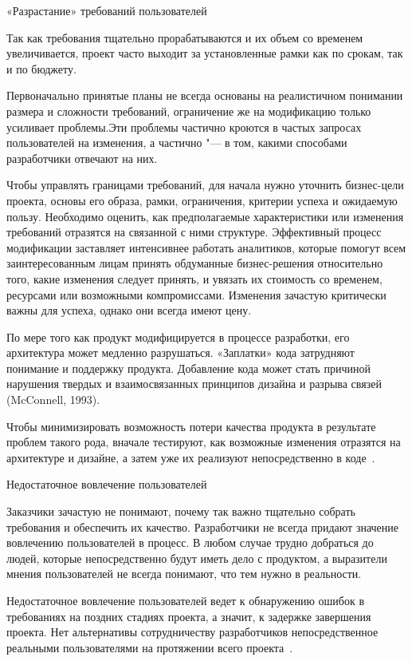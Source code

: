 \documentclass{../industrial-development}
\begin{document}
{\alert{«Разрастание» требований пользователей}

Так как требования тщательно прорабатываются и их объем со временем увеличивается, проект часто выходит за установленные рамки как по срокам, так и по бюджету. 

Первоначально принятые планы не всегда основаны на реалистичном понимании размера и сложности требований, ограничение же на модификацию только усиливает проблемы.Эти проблемы частично кроются в частых запросах пользователей на изменения, а частично "--- в том, какими способами разработчики отвечают на них.

Чтобы управлять границами требований, для начала нужно уточнить бизнес-цели проекта, основы его образа, рамки, ограничения, критерии успеха и ожидаемую пользу. Необходимо оценить, как предполагаемые характеристики или изменения требований отразятся на связанной с ними структуре. Эффективный процесс модификации заставляет интенсивнее работать аналитиков, которые помогут всем заинтересованным
лицам принять обдуманные бизнес-решения относительно того, какие изменения следует принять, и увязать их стоимость со временем, ресурсами или возможными компромиссами. Изменения зачастую критически важны для успеха, однако они всегда имеют цену.

По мере того как продукт модифицируется в процессе разработки, его архитектура может медленно разрушаться. «Заплатки» кода затрудняют понимание и поддержку продукта. Добавление кода может стать причиной нарушения твердых и взаимосвязанных принципов дизайна и разрыва связей (McConnell, 1993). 

Чтобы минимизировать возможность потери качества продукта в результате проблем такого рода, вначале тестируют, как возможные изменения отразятся на архитектуре и дизайне, а затем уже их реализуют непосредственно в коде~\cite[с.~17-18]{Wiegers}.

\alert{Недостаточное вовлечение пользователей}

Заказчики зачастую не понимают, почему так важно тщательно собрать требования и обеспечить их качество. Разработчики не всегда придают значение вовлечению пользователей в процесс. В любом случае трудно добраться до людей, которые непосредственно будут иметь дело с продуктом, а выразители мнения пользователей не всегда понимают, что тем нужно в реальности. 

Недостаточное вовлечение пользователей ведет к обнаружению ошибок в требованиях на поздних стадиях проекта, а значит, к задержке завершения проекта. Нет альтернативы сотрудничеству разработчиков непосредственное реальными пользователями на протяжении всего проекта~\cite[с.~17]{Wiegers}.


}
\end{document}

